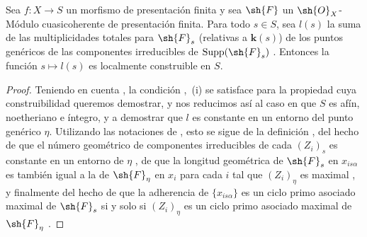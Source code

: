 \begin{proposition}[9.8.8]
\label{IV.9.8.8}
Sea $f:X\to S$ un morfismo de presentación finita y sea $\sh{F}$ un $\sh{O}_X$-Módulo cuasicoherente de presentación finita.
Para todo $s\in S$, sea $l(s)$ la suma de las multiplicidades totales para $\sh{F}_s$ (relativas a $\mathbf{k}(s)$) de los puntos genéricos de las componentes irreducibles de $\operatorname{Supp}(\sh{F}_s)$ .
Entonces la función $s\mapsto l(s)$ es localmente construible en $S$.
\end{proposition}

\begin{proof}
\label{IV.9.8.8-proof}
Teniendo en cuenta , la condición ,~(i) se satisface para la propiedad cuya construibilidad queremos demostrar, y nos reducimos así al caso en que $S$ es afín, noetheriano e íntegro, y a demostrar que $l$ es constante en un entorno del punto genérico $\eta$.
Utilizando las notaciones de , esto se sigue de la definición , del hecho de que el número geométrico de componentes irreducibles de cada $(Z_i)_s$ es constante en un entorno de $\eta$ , de que la longitud geométrica de $\sh{F}_s$ en $x_{is\alpha}$ es también igual a la de $\sh{F}_\eta$ en $x_i$ para cada $i$ tal que $(Z_i)_\eta$ es maximal , y finalmente del hecho de que la adherencia de $\{x_{is\alpha}\}$ es un ciclo primo asociado maximal de $\sh{F}_s$ si y solo si $(Z_i)_\eta$ es un ciclo primo asociado maximal de $\sh{F}_\eta$ .
\end{proof}

